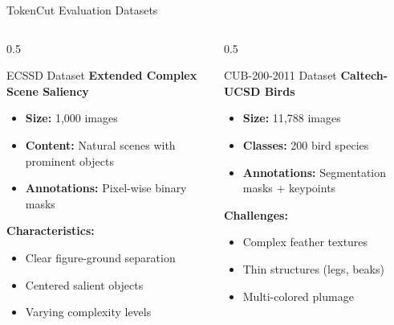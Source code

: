 \documentclass[aspectratio=169]{beamer}
\begin{document}
\begin{frame}{TokenCut Evaluation Datasets}
\begin{columns}
\begin{column}{0.5\textwidth}
\begin{block}{ECSSD Dataset}
\textbf{Extended Complex Scene Saliency}
\end{block}
\begin{itemize}
    \item \textbf{Size:} 1,000 images
    \item \textbf{Content:} Natural scenes with prominent objects
    \item \textbf{Annotations:} Pixel-wise binary masks
\end{itemize}
\vspace{0.2cm}
\textbf{Characteristics:}
\begin{itemize}
    \item Clear figure-ground separation
    \item Centered salient objects
    \item Varying complexity levels
\end{itemize}

\end{column}

\begin{column}{0.5\textwidth}
\begin{block}{CUB-200-2011 Dataset}
\textbf{Caltech-UCSD Birds}
\end{block}
\begin{itemize}
    \item \textbf{Size:} 11,788 images
    \item \textbf{Classes:} 200 bird species
    \item \textbf{Annotations:} Segmentation masks + keypoints
\end{itemize}
\vspace{0.2cm}
\textbf{Challenges:}
\begin{itemize}
    \item Complex feather textures
    \item Thin structures (legs, beaks)
    \item Multi-colored plumage
\end{itemize}

\end{column}
\end{columns}
\end{frame}
\end{document}
